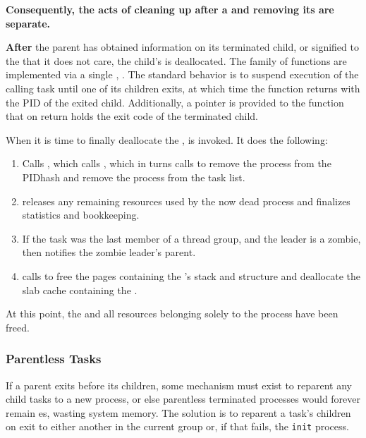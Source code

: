 \begin{center}
  \large{\textbf{Consequently, the acts of cleaning up after a  and removing its  are separate.}}
\end{center}

\textbf{After} the parent has obtained information on its terminated child, or signified to the  that it does not care, the child’s  is deallocated.
The  family of functions are implemented via a single , .
The standard behavior is to suspend execution of the calling task until one of its children exits, at which time the function returns with the PID of the exited child.
Additionally, a pointer is provided to the function that on return holds the exit code of the terminated child.

When it is time to finally deallocate the ,  is invoked.
It does the following:
\begin{enumerate}
\item Calls , which calls , which in turns calls  to remove the process from the PIDhash and remove the process from the task list.
\item {} releases any remaining resources used by the now dead process and finalizes statistics and bookkeeping.
\item If the task was the last member of a thread group, and the leader is a zombie, then  notifies the zombie leader’s parent.
\item {} calls  to free the pages containing the ’s  stack and  structure and deallocate the slab cache containing the .
\end{enumerate}

At this point, the  and all resources belonging solely to the process
have been freed.

\subsubsection{Parentless Tasks}\label{subsubsec:Parentless_Tasks}
If a parent exits before its children, some mechanism must exist to reparent any child tasks to a new process, or else parentless terminated processes would forever remain es, wasting system memory.
The solution is to reparent a task’s children on exit to either another  in the current  group or, if that fails, the \texttt{init} process.

